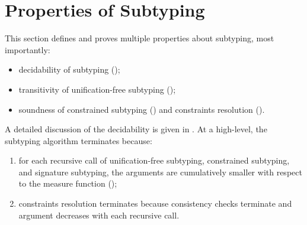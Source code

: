 \section{Properties of Subtyping}

This section defines and proves multiple properties about subtyping,
most importantly:
\begin{itemize}
    \item decidability of subtyping ();
    \item transitivity of unification-free subtyping ();
    \item soundness of constrained subtyping () 
        and constraints resolution ().
\end{itemize}

A detailed discussion of the decidability is given in .
At a high-level, the subtyping algorithm terminates because:
\begin{enumerate}
    \item for each recursive call of unification-free subtyping, 
        constrained subtyping, and signature subtyping, the arguments are
        cumulatively smaller with respect to the measure function
        ();
    \item constraints resolution terminates because consistency checks terminate
        and \UEnv argument decreases with each recursive call.
\end{enumerate}



